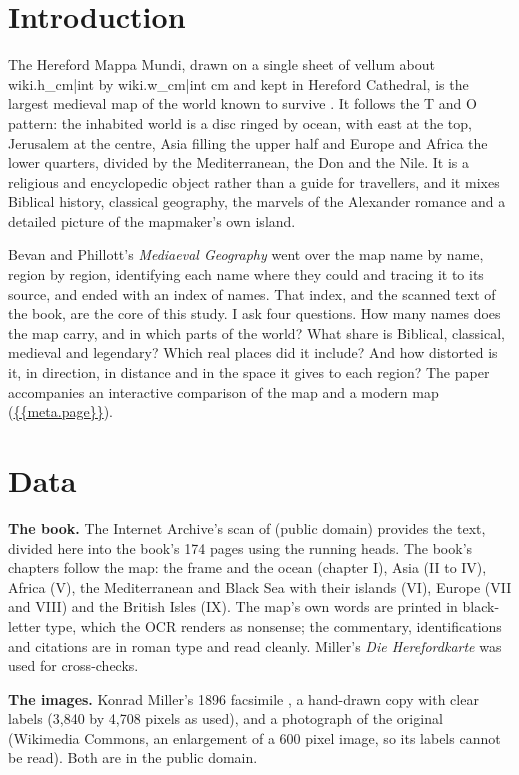 \documentclass[11pt,a4paper]{article}
\begin{document}
\section{Introduction}
The Hereford Mappa Mundi, drawn on a single sheet of vellum about {{wiki.h_cm|int}} by {{wiki.w_cm|int}} cm and kept in Hereford Cathedral, is the largest medieval map of the world known to survive \citep{wiki}. It follows the T and O pattern: the inhabited world is a disc ringed by ocean, with east at the top, Jerusalem at the centre, Asia filling the upper half and Europe and Africa the lower quarters, divided by the Mediterranean, the Don and the Nile. It is a religious and encyclopedic object rather than a guide for travellers, and it mixes Biblical history, classical geography, the marvels of the Alexander romance and a detailed picture of the mapmaker's own island.

Bevan and Phillott's \textit{Mediaeval Geography} \citep{bevan} went over the map name by name, region by region, identifying each name where they could and tracing it to its source, and ended with an index of names. That index, and the scanned text of the book, are the core of this study. I ask four questions. How many names does the map carry, and in which parts of the world? What share is Biblical, classical, medieval and legendary? Which real places did it include? And how distorted is it, in direction, in distance and in the space it gives to each region? The paper accompanies an interactive comparison of the map and a modern map (\url{{{meta.page}}}).

\section{Data}
\textbf{The book.} The Internet Archive's scan of \citet{bevan} (public domain) provides the text, divided here into the book's 174 pages using the running heads. The book's chapters follow the map: the frame and the ocean (chapter I), Asia (II to IV), Africa (V), the Mediterranean and Black Sea with their islands (VI), Europe (VII and VIII) and the British Isles (IX). The map's own words are printed in black-letter type, which the OCR renders as nonsense; the commentary, identifications and citations are in roman type and read cleanly. Miller's \textit{Die Herefordkarte} \citep{miller1903} was used for cross-checks.

\textbf{The images.} Konrad Miller's 1896 facsimile \citep{miller1896}, a hand-drawn copy with clear labels (3,840 by 4,708 pixels as used), and a photograph of the original (Wikimedia Commons, an enlargement of a 600 pixel image, so its labels cannot be read). Both are in the public domain.
\end{document}
